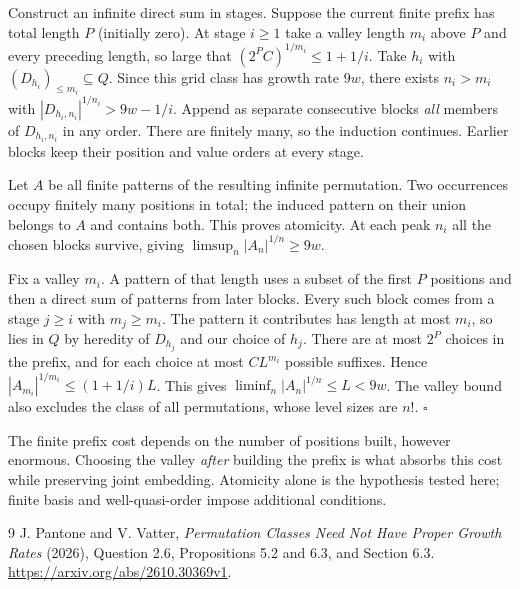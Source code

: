 \documentclass[11pt]{article}
\begin{document}
Construct an infinite direct sum in stages. Suppose the current finite prefix has total length $P$ (initially zero). At stage $i\ge1$ take a valley length $m_i$ above $P$ and every preceding length, so large that $(2^P C)^{1/m_i}\le1+1/i$. Take $h_i$ with $(D_{h_i})_{\le m_i}\subseteq Q$. Since this grid class has growth rate $9w$, there exists $n_i>m_i$ with $|D_{h_i,n_i}|^{1/n_i}>9w-1/i$. Append as separate consecutive blocks \emph{all} members of $D_{h_i,n_i}$ in any order. There are finitely many, so the induction continues. Earlier blocks keep their position and value orders at every stage.

Let $A$ be all finite patterns of the resulting infinite permutation. Two occurrences occupy finitely many positions in total; the induced pattern on their union belongs to $A$ and contains both. This proves atomicity. At each peak $n_i$ all the chosen blocks survive, giving $\limsup_n|A_n|^{1/n}\ge9w$.

Fix a valley $m_i$. A pattern of that length uses a subset of the first $P$ positions and then a direct sum of patterns from later blocks. Every such block comes from a stage $j\ge i$ with $m_j\ge m_i$. The pattern it contributes has length at most $m_i$, so lies in $Q$ by heredity of $D_{h_j}$ and our choice of $h_j$. There are at most $2^P$ choices in the prefix, and for each choice at most $C L^{m_i}$ possible suffixes. Hence $|A_{m_i}|^{1/m_i}\le(1+1/i)L$. This gives $\liminf_n|A_n|^{1/n}\le L<9w$. The valley bound also excludes the class of all permutations, whose level sizes are $n!$. \hfill$\square$

The finite prefix cost depends on the number of positions built, however enormous. Choosing the valley \emph{after} building the prefix is what absorbs this cost while preserving joint embedding. Atomicity alone is the hypothesis tested here; finite basis and well-quasi-order impose additional conditions.
\begin{thebibliography}{9}
 J. Pantone and V. Vatter, \emph{Permutation Classes Need Not Have Proper Growth Rates} (2026), Question 2.6, Propositions 5.2 and 6.3, and Section 6.3. \url{https://arxiv.org/abs/2610.30369v1}.
\end{thebibliography}
\end{document}
